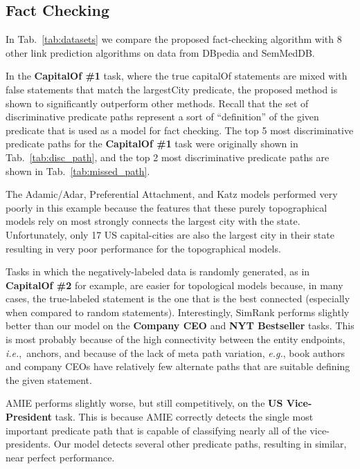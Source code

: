 \documentclass[reprint,twocolumn,showpacs,preprintnumbers,amsmath, aps,pre,amssymb]{revtex4-1}
\newcommand\eg{\emph{e.g.}}
\newcommand\ie{\emph{i.e.}}
\begin{document}
\subsection{Fact Checking}

In Tab.~\ref{tab:datasets} we compare the proposed fact-checking algorithm with 8 other link prediction algorithms on data from DBpedia and SemMedDB.

In the \textbf{CapitalOf \#1} task, where the true \textsf{capitalOf} statements are mixed with false statements that match the \textsf{largestCity} predicate, the proposed method is shown to significantly outperform other methods. Recall that the set of discriminative predicate paths represent a sort of ``definition'' of the given predicate that is used as a model for fact checking. The top 5 most discriminative predicate paths for the \textbf{CapitalOf \#1} task were originally shown in Tab.~\ref{tab:disc_path}, and the top 2 most discriminative predicate paths are shown in Tab.~\ref{tab:missed_path}.

The Adamic/Adar, Preferential Attachment, and Katz models performed very poorly in this example because the features that these purely topographical models rely on most strongly connects the largest city with the state. Unfortunately, only 17 US capital-cities are also the largest city in their state resulting in very poor performance for the topographical models. 


Tasks in which the negatively-labeled data is randomly generated, as in \textbf{CapitalOf \#2} for example, are easier for topological models because, in many cases, the true-labeled statement is the one that is the best connected (especially when compared to random statements). Interestingly, SimRank performs slightly better than our model on the \textbf{Company CEO} and \textbf{NYT Bestseller} tasks. This is most probably because of the high connectivity between the entity endpoints, \ie,~anchors, and because of the lack of meta path variation, \eg, book authors and company CEOs have relatively few alternate paths that are suitable defining the given statement.%


AMIE performs slightly worse, but still competitively, on the \textbf{US Vice-President} task. This is because AMIE correctly detects the single most important predicate path that is capable of classifying nearly all of the vice-presidents. Our model detects several other predicate paths, resulting in similar, near perfect performance.
\end{document}
